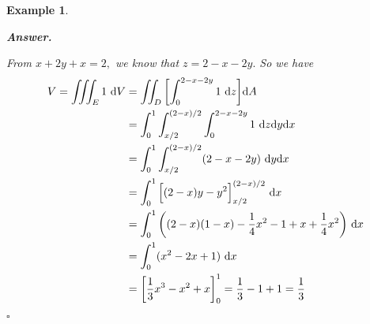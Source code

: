 \documentclass[12pt,a4paper]{article}
\newtheorem{eg}{Example}[subsection]
\newenvironment*{ans}{\par\indent\textbf{\textit{Answer. }}\par}{\par\hfill{$\square$}\par}
\def\dsst{\displaystyle}
\def\d{{\mathrm{d}}}
\def\dx{\d x}
\def\dy{\d y}
\def\dz{\d z}
\def\dA{\d A}
\def\iintD{\dsst\iint_D}
\def\iiintE{\dsst\iiint_E}
\begin{document}
\begin{eg}
\begin{center}
\end{center}
\begin{ans}
	From $x+2y+x=2,$ we know that $z=2-x-2y.$ So we have \[\begin{aligned}V=\iiintE1\ \d V&=\iintD\qty[\int_0^{2-x-2y}1\ \dz]\dA\\&=\int_0^1\int_{x/2}^{(2-x)/2}\int_0^{2-x-2y}1\ \dz\dy\dx\\&=\int_0^1\int_{x/2}^{(2-x)/2}(2-x-2y)\ \dy\dx\\&=\int_0^1\qty\Big[(2-x)y-y^2]_{x/2}^{(2-x)/2}\ \dx\\&=\int_0^1\qty((2-x)(1-x)-\dfrac{1}{4}x^2-1+x+\dfrac{1}{4}x^2)\ \dx\\&=\int_0^1(x^2-2x+1)\ \dx\\&=\qty[\dfrac{1}{3}x^3-x^2+x]_0^1=\dfrac{1}{3}-1+1=\dfrac{1}{3}\end{aligned}\]
\end{ans}
\end{eg}
\end{document}
